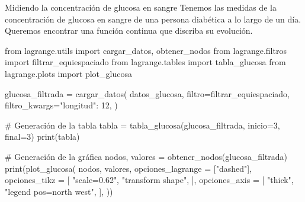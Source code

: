 \begin{frame}[fragile]{Midiendo la concentración de glucosa en sangre}
  Tenemos las medidas de la concentración de glucosa en sangre de una
  persona diabética a lo largo de un día. Queremos encontrar una
  \alert{función continua} que discriba su evolución.
  
  \begin{multicols}{2}
    \begin{pycode}[glucosa]
      from lagrange.utils import cargar_datos, obtener_nodos
      from lagrange.filtros import filtrar_equiespaciado
      from lagrange.tables import tabla_glucosa
      from lagrange.plots import plot_glucosa

      glucosa_filtrada = cargar_datos(
        datos_glucosa,
        filtro=filtrar_equiespaciado,
        filtro_kwargs={"longitud": 12},
      )
    \end{pycode}

    \begin{pycode}[glucosa]
      # Generación de la tabla
      tabla = tabla_glucosa(glucosa_filtrada, inicio=3, final=3)
      print(tabla)
    \end{pycode}

    \columnbreak

    \begin{pycode}[glucosa]
      # Generación de la gráfica
      nodos, valores = obtener_nodos(glucosa_filtrada)
      print(plot_glucosa(
        nodos,
        valores,
        opciones_lagrange = ["dashed"],
        opciones_tikz = [
          "scale=0.62",
          "transform shape",
        ],
        opciones_axis = [
          "thick",
          "legend pos=north west",
        ],
      ))
    \end{pycode}
  \end{multicols}
\end{frame}
